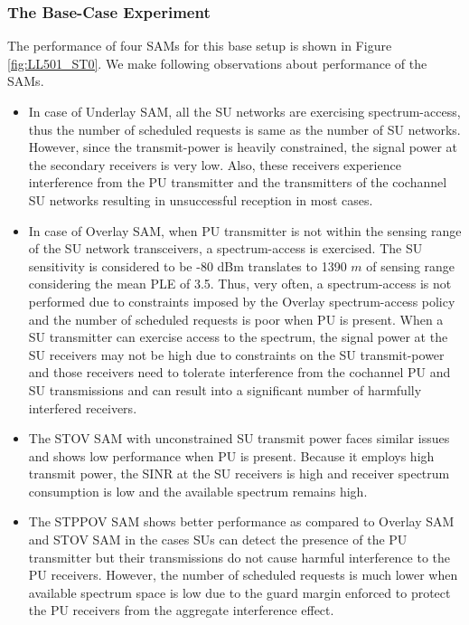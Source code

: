 \documentclass[12pt, draftclsnofoot, onecolumn]{IEEEtran}
\begin{document}
\subsubsection{The Base-Case Experiment}
The performance of four SAMs for this base setup is shown in Figure \ref{fig:LL501_ST0}. We make following observations about  performance of the SAMs.
\begin{itemize}
	\item In case of Underlay SAM, all the SU networks are exercising spectrum-access, thus the number of scheduled requests is same as the number of SU networks. However, since the transmit-power is heavily constrained,  the signal power at the secondary receivers is very low. Also, these receivers experience interference from the PU transmitter and the transmitters of the cochannel SU networks resulting in unsuccessful reception in most cases.
	\item In case of Overlay SAM, when PU transmitter is not within the sensing range of the SU network transceivers, a spectrum-access is exercised. The SU sensitivity is considered to be -80 dBm translates to 1390 $m$ of sensing range considering the mean PLE of 3.5. Thus, very often, a spectrum-access is not performed due to constraints imposed by the Overlay spectrum-access policy and the number of scheduled requests is poor when PU is present. When a SU transmitter can exercise access to the spectrum, the signal power at the SU receivers may not be high due to constraints on the SU transmit-power and those receivers need to tolerate interference from the cochannel PU and SU transmissions and can result into a significant number of harmfully interfered receivers.
	\item The STOV SAM with unconstrained SU transmit power faces similar issues and shows low performance when PU is present. Because it employs high transmit power, the SINR at the SU receivers is high and receiver spectrum consumption is low and the available spectrum remains high.
	\item The STPPOV SAM shows better performance as compared to Overlay SAM and STOV SAM in the cases SUs can detect the presence of the PU transmitter but their transmissions do not cause harmful interference to the PU receivers. However, the number of  scheduled requests is much lower when available spectrum space is low due to the guard margin enforced to protect the PU receivers from the aggregate interference effect.
\end{itemize}
\end{document}
